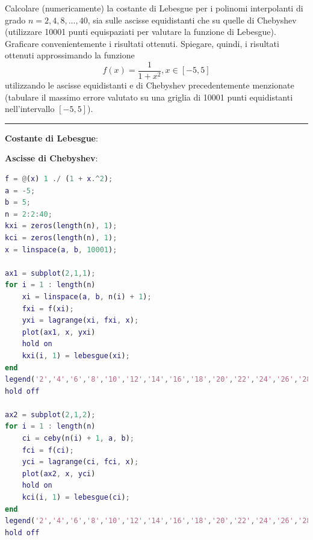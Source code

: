 Calcolare (numericamente) la costante di Lebesgue per i polinomi interpolanti di grado $n = 2, 4, 8, ... , 40$, sia sulle ascisse equidistanti che su quelle di Chebyshev (utilizzare 10001 punti equispaziati per valutare la funzione di Lebesgue). Graficare convenientemente i risultati ottenuti. Spiegare, quindi, i risultati ottenuti approssimando la funzione
$$f(x)=\frac{1}{1+x^{2}},x\in[ - 5,5]$$
utilizzando le ascisse equidistanti e di Chebyshev precedentemente menzionate (tabulare il massimo errore valutato su una griglia di 10001 punti equidistanti nell’intervallo $[ - 5,5]$).

\hspace{1cm}
\par\noindent\rule{\textwidth}{0.4pt}
\hspace{1cm}

\textbf{Costante di Lebesgue}:

\textbf{Ascisse di Chebyshev}:


\begin{lstlisting}[language=Matlab, caption=Codice Matlab]
f = @(x) 1 ./ (1 + x.^2);
a = -5;
b = 5;
n = 2:2:40;
kxi = zeros(length(n), 1);
kci = zeros(length(n), 1);
x = linspace(a, b, 10001);

ax1 = subplot(2,1,1);
for i = 1 : length(n)
	xi = linspace(a, b, n(i) + 1);
	fxi = f(xi);
	yxi = lagrange(xi, fxi, x);
	plot(ax1, x, yxi)
	hold on
	kxi(i, 1) = lebesgue(xi);
end
legend('2','4','6','8','10','12','14','16','18','20','22','24','26','28','30','32','34','36','38','40')
hold off

ax2 = subplot(2,1,2);
for i = 1 : length(n)
	ci = ceby(n(i) + 1, a, b);
	fci = f(ci);
	yci = lagrange(ci, fci, x);
	plot(ax2, x, yci)
	hold on
	kci(i, 1) = lebesgue(ci);
end
legend('2','4','6','8','10','12','14','16','18','20','22','24','26','28','30','32','34','36','38','40')
hold off
\end{lstlisting}

